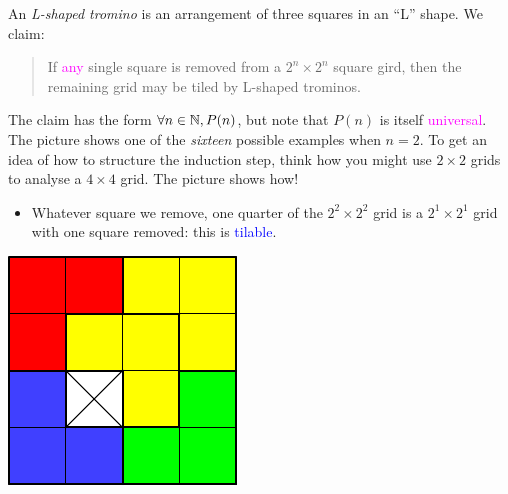 \begin{example}{}{}
	An \emph{L-shaped tromino} is an arrangement of three squares in an ``L'' shape. We claim:\par
	\begin{minipage}[t]{0.75\linewidth}\vspace{-4pt}
		\begin{quote}
			If \textcolor{Magenta}{any} single square is removed from a $2^n\times 2^n$ square gird, then the remaining grid may be tiled by L-shaped trominos.
		\end{quote}
		\vspace{-6pt}
		The claim has the form $\forall n\in\mathbb{N},P(n)$, but note that $P(n)$ is itself \textcolor{Magenta}{universal}. The picture shows one of the \emph{sixteen} possible examples when $n=2$. To get an idea of how to structure the induction step, think how you might use $2\times 2$ grids to analyse a $4\times 4$ grid. The picture shows how!
		\begin{itemize}
		  \item Whatever square we remove, one quarter of the $2^2\times 2^2$ grid is a $2^1\times 2^1$ grid with one square removed: this is \textcolor{blue}{tilable}.
		\end{itemize}
	\end{minipage}
	\hfill
	\begin{minipage}[t]{0.24\linewidth}\vspace{0pt}
		\flushright\includegraphics{induction-11-tilingexample}
	\end{minipage}
	\par
\vspace{-2pt}
		

\end{example}
